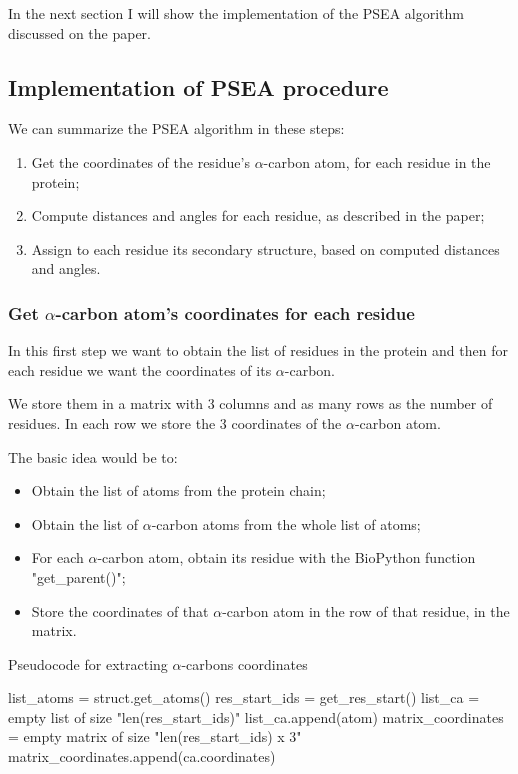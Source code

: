 In the next section I will show the implementation of the PSEA algorithm discussed on the paper\cite{psea}.

\pagebreak

\subsection{Implementation of PSEA procedure}
We can summarize the PSEA algorithm in these steps:
\begin{enumerate}
    \item Get the coordinates of the residue's $\alpha$-carbon atom, for each residue in the protein;
    \item Compute distances and angles for each residue, as described in the paper;
    \item Assign to each residue its secondary structure, based on computed distances and angles.
\end{enumerate}

\subsubsection{Get $\alpha$-carbon atom's coordinates for each residue}
In this first step we want to obtain the list of residues in the protein and then for each residue we want the coordinates of its $\alpha$-carbon.

We store them in a matrix with 3 columns and as many rows as the number of residues. In each row we store the 3 coordinates of the $\alpha$-carbon atom.

The basic idea would be to:
\begin{itemize}
    \item Obtain the list of atoms from the protein chain; 
    \item Obtain the list of $\alpha$-carbon atoms from the whole list of atoms;
    \item For each $\alpha$-carbon atom, obtain its residue with the BioPython function "get\_parent()";
    \item Store the coordinates of that $\alpha$-carbon atom in the row of that residue, in the matrix.
\end{itemize}

\begin{algorithm}[ht]
    \caption{Pseudocode for extracting $\alpha$-carbons coordinates}\label{alg:two}
    \begin{algorithmic}
        \STATE list\_atoms = struct.get\_atoms()
        \STATE res\_start\_ids = get\_res\_start()
        \STATE list\_ca = empty list of size "len(res\_start\_ids)"
                \STATE list\_ca.append(atom)
            \ENDIF
        \ENDFOR
        \STATE matrix\_coordinates = empty matrix of size "len(res\_start\_ids) x 3"
            \STATE matrix\_coordinates.append(ca.coordinates)
        \ENDFOR
    \end{algorithmic}
\end{algorithm}

